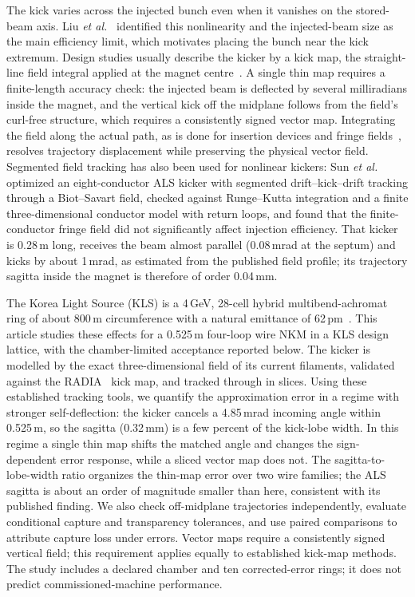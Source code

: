 \documentclass[aps,prab,reprint,amsmath,amssymb,floatfix,longbibliography]{revtex4-2}
\begin{document}
The kick varies across the injected bunch even when it vanishes on the stored-beam axis. Liu \emph{et al.}~\cite{Liu2016} identified this nonlinearity and the injected-beam size as the main efficiency limit, which motivates placing the bunch near the kick extremum. Design studies usually describe the kicker by a kick map, the straight-line field integral applied at the magnet centre~\cite{Elleaume1992}. A single thin map requires a finite-length accuracy check: the injected beam is deflected by several milliradians inside the magnet, and the vertical kick off the midplane follows from the field's curl-free structure, which requires a consistently signed vector map. Integrating the field along the actual path, as is done for insertion devices and fringe fields~\cite{Wu2003}, resolves trajectory displacement while preserving the physical vector field. Segmented field tracking has also been used for nonlinear kickers: Sun \emph{et al.}~\cite{Sun2020} optimized an eight-conductor ALS kicker with segmented drift--kick--drift tracking through a Biot--Savart field, checked against Runge--Kutta integration and a finite three-dimensional conductor model with return loops, and found that the finite-conductor fringe field did not significantly affect injection efficiency. That kicker is 0.28\,m long, receives the beam almost parallel (0.08\,mrad at the septum) and kicks by about 1\,mrad, as estimated from the published field profile; its trajectory sagitta inside the magnet is therefore of order 0.04\,mm.

The Korea Light Source (KLS) is a 4\,GeV, 28-cell hybrid multibend-achromat ring of about 800\,m circumference with a natural emittance of 62\,pm~\cite{Kim2025}. This article studies these effects for a 0.525\,m four-loop wire NKM in a KLS design lattice, with the chamber-limited acceptance reported below. The kicker is modelled by the exact three-dimensional field of its current filaments, validated against the RADIA~\cite{Chubar1998} kick map, and tracked through in slices. Using these established tracking tools, we quantify the approximation error in a regime with stronger self-deflection: the kicker cancels a 4.85\,mrad incoming angle within 0.525\,m, so the sagitta (0.32\,mm) is a few percent of the kick-lobe width. In this regime a single thin map shifts the matched angle and changes the sign-dependent error response, while a sliced vector map does not. The sagitta-to-lobe-width ratio organizes the thin-map error over two wire families; the ALS sagitta is about an order of magnitude smaller than here, consistent with its published finding. We also check off-midplane trajectories independently, evaluate conditional capture and transparency tolerances, and use paired comparisons to attribute capture loss under errors. Vector maps require a consistently signed vertical field; this requirement applies equally to established kick-map methods. The study includes a declared chamber and ten corrected-error rings; it does not predict commissioned-machine performance.
\end{document}
